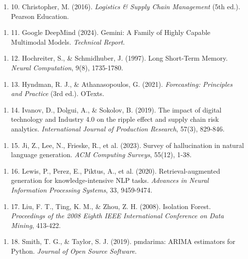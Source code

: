 \documentclass[12pt, a4paper]{report}
\begin{document}
\begin{enumerate}
\item 10. Christopher, M. (2016). \textit{Logistics \& Supply Chain Management} (5th ed.). Pearson Education.
\end{enumerate}

\begin{enumerate}
\item 11. Google DeepMind (2024). Gemini: A Family of Highly Capable Multimodal Models. \textit{Technical Report}.
\end{enumerate}

\begin{enumerate}
\item 12. Hochreiter, S., \& Schmidhuber, J. (1997). Long Short-Term Memory. \textit{Neural Computation}, 9(8), 1735-1780.
\end{enumerate}

\begin{enumerate}
\item 13. Hyndman, R. J., \& Athanasopoulos, G. (2021). \textit{Forecasting: Principles and Practice} (3rd ed.). OTexts.
\end{enumerate}

\begin{enumerate}
\item 14. Ivanov, D., Dolgui, A., \& Sokolov, B. (2019). The impact of digital technology and Industry 4.0 on the ripple effect and supply chain risk analytics. \textit{International Journal of Production Research}, 57(3), 829-846.
\end{enumerate}

\begin{enumerate}
\item 15. Ji, Z., Lee, N., Frieske, R., et al. (2023). Survey of hallucination in natural language generation. \textit{ACM Computing Surveys}, 55(12), 1-38.
\end{enumerate}

\begin{enumerate}
\item 16. Lewis, P., Perez, E., Piktus, A., et al. (2020). Retrieval-augmented generation for knowledge-intensive NLP tasks. \textit{Advances in Neural Information Processing Systems}, 33, 9459-9474.
\end{enumerate}

\begin{enumerate}
\item 17. Liu, F. T., Ting, K. M., \& Zhou, Z. H. (2008). Isolation Forest. \textit{Proceedings of the 2008 Eighth IEEE International Conference on Data Mining}, 413-422.
\end{enumerate}

\begin{enumerate}
\item 18. Smith, T. G., \& Taylor, S. J. (2019). pmdarima: ARIMA estimators for Python. \textit{Journal of Open Source Software}.
\end{enumerate}


\clearpage
\end{document}
